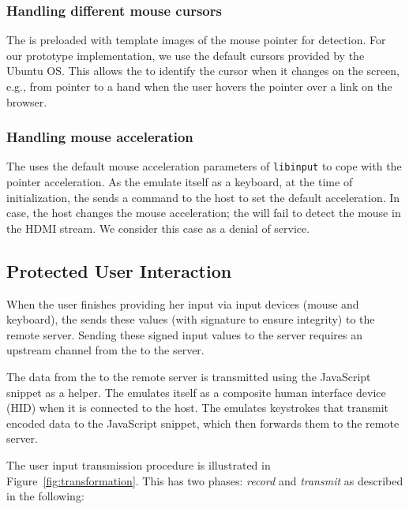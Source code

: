 \subsubsection{\bfseries Handling different mouse cursors} The \device is preloaded with template images of the mouse pointer for detection. For our \name prototype implementation, we use the default cursors provided by the Ubuntu OS. This allows the \device to identify the cursor when it changes on the screen, e.g., from pointer to a hand when the user hovers the pointer over a link on the browser. 

 
\subsubsection{\bfseries Handling mouse acceleration} The \device uses the default mouse acceleration parameters of \texttt{libinput} to cope with the pointer acceleration. As the \device emulate itself as a keyboard, at the time of initialization, the \device sends a command to the host to set the default acceleration. In case, the host changes the mouse acceleration; the \device will fail to detect the mouse in the HDMI stream. We consider this case as a denial of service.

\subsection{Protected User Interaction}
\label{sec:systemDesign:commit}

When the user finishes providing her input via input devices (mouse and keyboard), the \device sends these values (with signature to ensure integrity) to the remote server. Sending these signed input values to the server requires an upstream channel from the \device to the server.

\label{sec:systemDesign:commit:upload} 
The data from the \device to the remote server is transmitted using the \name JavaScript snippet as a helper. 
The \device emulates itself as a composite human interface device (HID) when it is connected to the host. The \device emulates keystrokes that transmit encoded data to the \name JavaScript snippet, which then forwards them to the remote server.

\label{sec:systemDesign:commit:send}
The user input transmission procedure is illustrated in Figure~\ref{fig:transformation}. This has two phases: \emph{record} and \emph{transmit} as described in the following:

